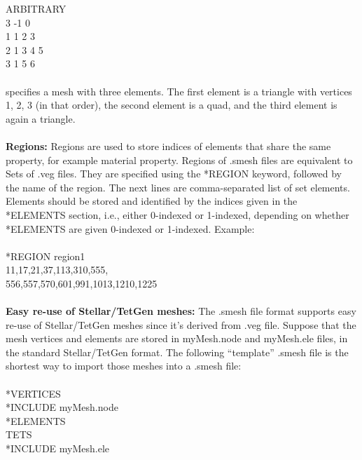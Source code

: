 \documentclass[11pt,fullpage]{article}
\begin{document}
ARBITRARY\\
3 -1 0\\
1 1 2 3\\
2 1 3 4 5\\
3 1 5 6
\\\\
\noindent{} specifies a mesh with three elements. The first element is
a triangle with vertices 1, 2, 3 (in that order), the second
element is a quad, and the third element is again a triangle.
\\\\
\noindent{}\textbf{Regions:} Regions are used to store indices of elements that share the same property,
for example material property. Regions of .smesh files are equivalent to
Sets of .veg files. They are specified using the *REGION
keyword, followed by the name of the region. The next lines are
comma-separated list of set elements. Elements should be stored and
identified by the indices given in the *ELEMENTS section, i.e., either
0-indexed or 1-indexed, depending on whether *ELEMENTS are given
0-indexed or 1-indexed. Example:
\\\\
\noindent{}*REGION region1\\
\noindent{}11,17,21,37,113,310,555,\\
\noindent{}556,557,570,601,991,1013,1210,1225
\\\\
\noindent{}\textbf{Easy re-use of Stellar/TetGen meshes:} The .smesh file format supports
easy re-use of Stellar/TetGen meshes since it's derived from .veg
file. Suppose that the mesh vertices and elements are stored in
myMesh.node and myMesh.ele files, in the standard Stellar/TetGen
format. The following ``template'' .smesh file is the shortest way to
import those meshes into a .smesh file:
\\\\
\noindent{}*VERTICES\\
*INCLUDE myMesh.node\\
*ELEMENTS\\
TETS\\
*INCLUDE myMesh.ele



\end{document}
